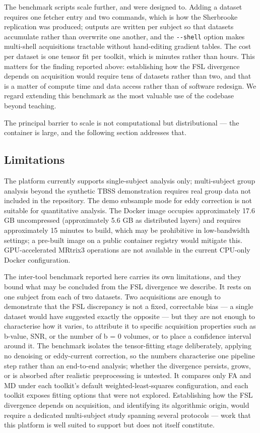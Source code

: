 \documentclass[12pt,a4paper]{article}
\begin{document}
The benchmark scripts scale further, and were designed to. Adding a dataset requires one fetcher entry and two commands, which is how the Sherbrooke replication was produced; outputs are written per subject so that datasets accumulate rather than overwrite one another, and the \texttt{-\/-shell} option makes multi-shell acquisitions tractable without hand-editing gradient tables. The cost per dataset is one tensor fit per toolkit, which is minutes rather than hours. This matters for the finding reported above: establishing how the FSL divergence depends on acquisition would require tens of datasets rather than two, and that is a matter of compute time and data access rather than of software redesign. We regard extending this benchmark as the most valuable use of the codebase beyond teaching.

The principal barrier to scale is not computational but distributional --- the container is large, and the following section addresses that.

\subsection{Limitations}\label{limitations}

The platform currently supports single-subject analysis only; multi-subject group analysis beyond the synthetic TBSS demonstration requires real group data not included in the repository. The demo subsample mode for eddy correction is not suitable for quantitative analysis. The Docker image occupies approximately 17.6 GB uncompressed (approximately 5.6 GB as distributed layers) and requires approximately 15 minutes to build, which may be prohibitive in low-bandwidth settings; a pre-built image on a public container registry would mitigate this. GPU-accelerated MRtrix3 operations are not available in the current CPU-only Docker configuration.

The inter-tool benchmark reported here carries its own limitations, and they bound what may be concluded from the FSL divergence we describe. It rests on one subject from each of two datasets. Two acquisitions are enough to demonstrate that the FSL discrepancy is not a fixed, correctable bias --- a single dataset would have suggested exactly the opposite --- but they are not enough to characterise how it varies, to attribute it to specific acquisition properties such as b-value, SNR, or the number of b = 0 volumes, or to place a confidence interval around it. The benchmark isolates the tensor-fitting stage deliberately, applying no denoising or eddy-current correction, so the numbers characterise one pipeline step rather than an end-to-end analysis; whether the divergence persists, grows, or is absorbed after realistic preprocessing is untested. It compares only FA and MD under each toolkit's default weighted-least-squares configuration, and each toolkit exposes fitting options that were not explored. Establishing how the FSL divergence depends on acquisition, and identifying its algorithmic origin, would require a dedicated multi-subject study spanning several protocols --- work that this platform is well suited to support but does not itself constitute.
\end{document}
